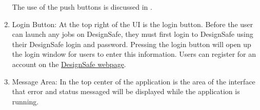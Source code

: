 \begin{enumerate}
The use of the push buttons is discussed in .

\item Login Button: At the top right of the UI is the login
  button. Before the user can launch any jobs on DesignSafe, they must
  first login to DesignSafe using their DesignSafe login and
  password. Pressing the login button will open up the login window
  for users to enter this information. Users can register for an
  account on
  the \href{https://www.designsafe-ci.org/account/register/}{DesignSafe
  webpage}.

\item Message Area: In the top center of the application is the area
  of the interface that error and status messaged will be displayed
  while the application is running.

\end{enumerate}
